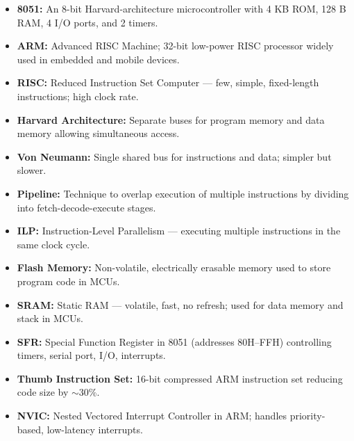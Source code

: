 \documentclass[12pt,a4paper]{article}
\begin{document}
\begin{tcolorbox}[defbox, title={\textbf{One-Line Definitions}}]
\begin{itemize}[leftmargin=*, itemsep=2.5pt, topsep=0pt]
  \item \textbf{8051:} An 8-bit Harvard-architecture microcontroller with 4 KB ROM, 128 B RAM, 4 I/O ports, and 2 timers.
  \item \textbf{ARM:} Advanced RISC Machine; 32-bit low-power RISC processor widely used in embedded and mobile devices.
  \item \textbf{RISC:} Reduced Instruction Set Computer --- few, simple, fixed-length instructions; high clock rate.
  \item \textbf{Harvard Architecture:} Separate buses for program memory and data memory allowing simultaneous access.
  \item \textbf{Von Neumann:} Single shared bus for instructions and data; simpler but slower.
  \item \textbf{Pipeline:} Technique to overlap execution of multiple instructions by dividing into fetch-decode-execute stages.
  \item \textbf{ILP:} Instruction-Level Parallelism --- executing multiple instructions in the same clock cycle.
  \item \textbf{Flash Memory:} Non-volatile, electrically erasable memory used to store program code in MCUs.
  \item \textbf{SRAM:} Static RAM --- volatile, fast, no refresh; used for data memory and stack in MCUs.
  \item \textbf{SFR:} Special Function Register in 8051 (addresses 80H--FFH) controlling timers, serial port, I/O, interrupts.
  \item \textbf{Thumb Instruction Set:} 16-bit compressed ARM instruction set reducing code size by $\sim$30\%.
  \item \textbf{NVIC:} Nested Vectored Interrupt Controller in ARM; handles priority-based, low-latency interrupts.
\end{itemize}
\end{tcolorbox}
\end{document}

